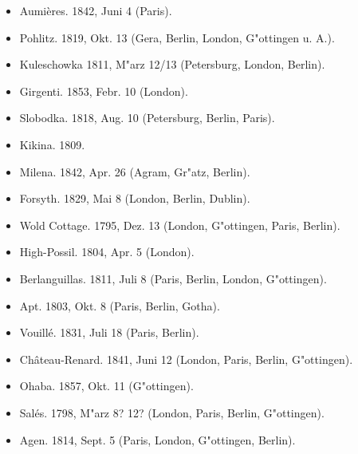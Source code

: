 \documentclass[a4paper, 11pt, oneside]{article}
\begin{document}
\begin{itemize}
\begin{itemize}
\begin{itemize}
            \item Aumières. 1842, Juni 4 (Paris).
        
            \item Pohlitz. 1819, Okt. 13 (Gera, Berlin, London, G"ottingen u. A.).
        
            \item Kuleschowka 1811, M"arz 12/13 (Petersburg, London, Berlin).
        
            \item Girgenti. 1853, Febr. 10 (London).
        
            \item Slobodka. 1818, Aug. 10 (Petersburg, Berlin, Paris).
        
            \item Kikina. 1809.
        
            \item Milena. 1842, Apr. 26 (Agram, Gr"atz, Berlin).
        
            \item Forsyth. 1829, Mai 8 (London, Berlin, Dublin).
        
            \item Wold Cottage. 1795, Dez. 13 (London, G"ottingen, Paris, Berlin).
        
            \item High-Possil. 1804, Apr. 5 (London).
        
            \item Berlanguillas. 1811, Juli 8 (Paris, Berlin, London, G"ottingen).
        
            \item Apt. 1803, Okt. 8 (Paris, Berlin, Gotha).

            \item Vouillé. 1831, Juli 18 (Paris, Berlin).
        
            \item Château-Renard. 1841, Juni 12 (London, Paris, Berlin, G"ottingen).
        
            \item Ohaba. 1857, Okt. 11 (G"ottingen).
        
            \item Salés. 1798, M"arz 8? 12? (London, Paris, Berlin, G"ottingen).
        
            \item Agen. 1814, Sept. 5 (Paris, London, G"ottingen, Berlin).
        

\end{itemize}
\end{itemize}
\end{itemize}
\end{document}

